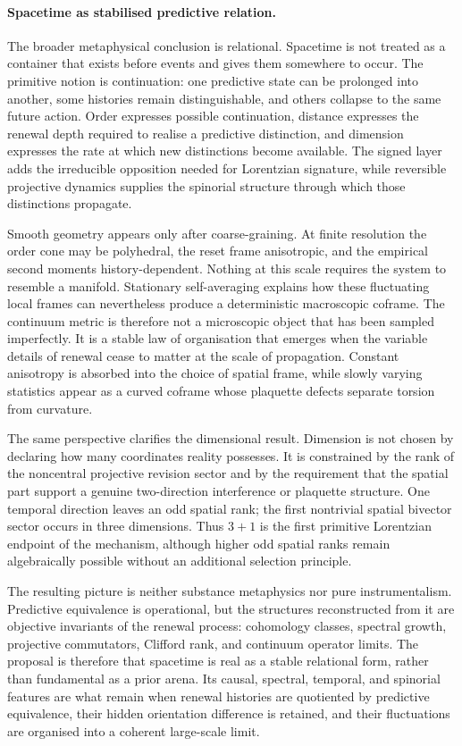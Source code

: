 \documentclass[11pt]{article}
\theoremstyle{definition}
\theoremstyle{remark}
\begin{document}
\paragraph{Spacetime as stabilised predictive relation.}
The broader metaphysical conclusion is relational.  Spacetime is not treated
as a container that exists before events and gives them somewhere to occur.
The primitive notion is continuation: one predictive state can be prolonged
into another, some histories remain distinguishable, and others collapse to
the same future action.  Order expresses possible continuation, distance
expresses the renewal depth required to realise a predictive distinction, and
dimension expresses the rate at which new distinctions become available.
The signed layer adds the irreducible opposition needed for Lorentzian
signature, while reversible projective dynamics supplies the spinorial
structure through which those distinctions propagate.

Smooth geometry appears only after coarse-graining.  At finite resolution the
order cone may be polyhedral, the reset frame anisotropic, and the empirical
second moments history-dependent.  Nothing at this scale requires the system
to resemble a manifold.  Stationary self-averaging explains how these
fluctuating local frames can nevertheless produce a deterministic macroscopic
coframe.  The continuum metric is therefore not a microscopic object that has
been sampled imperfectly.  It is a stable law of organisation that emerges
when the variable details of renewal cease to matter at the scale of
propagation.  Constant anisotropy is absorbed into the choice of spatial
frame, while slowly varying statistics appear as a curved coframe whose
plaquette defects separate torsion from curvature.

The same perspective clarifies the dimensional result.  Dimension is not
chosen by declaring how many coordinates reality possesses.  It is constrained
by the rank of the noncentral projective revision sector and by the requirement
that the spatial part support a genuine two-direction interference or
plaquette structure.  One temporal direction leaves an odd spatial rank; the
first nontrivial spatial bivector sector occurs in three dimensions.  Thus
\(3+1\) is the first primitive Lorentzian endpoint of the mechanism, although
higher odd spatial ranks remain algebraically possible without an additional
selection principle.

The resulting picture is neither substance metaphysics nor pure
instrumentalism.  Predictive equivalence is operational, but the structures
reconstructed from it are objective invariants of the renewal process:
cohomology classes, spectral growth, projective commutators, Clifford rank,
and continuum operator limits.  The proposal is therefore that spacetime is
real as a stable relational form, rather than fundamental as a prior arena.
Its causal, spectral, temporal, and spinorial features are what remain when
renewal histories are quotiented by predictive equivalence, their hidden
orientation difference is retained, and their fluctuations are organised
into a coherent large-scale limit.
\end{document}
